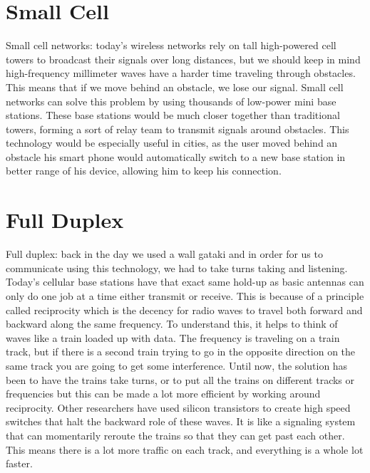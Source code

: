 \section{Small Cell}
Small cell networks: today’s wireless networks rely on tall high-powered cell towers to broadcast their signals over long distances, but we should keep in mind high-frequency millimeter waves have a harder time traveling through obstacles. This means that if we move behind an obstacle, we lose our signal. Small cell networks can solve this problem by using thousands of low-power mini base stations. These base stations would be much closer together than traditional towers, forming a sort of relay team to transmit signals around obstacles. This technology would be especially useful in cities, as the user moved behind an obstacle his smart phone would automatically switch to a new base station in better range of his device, allowing him to keep his connection.

\section{Full Duplex}
Full duplex: back in the day we used a wall gataki and in order for us to communicate using this technology, we had to take turns taking and listening. Today’s cellular base stations have that exact same hold-up as basic antennas can only do one job at a time either transmit or receive. This is because of a principle called reciprocity which is the decency for radio waves to travel both forward and backward along the same frequency. To understand this, it helps to think of waves like a train loaded up with data. The frequency is traveling on a train track, but if there is a second train trying to go in the opposite direction on the same track you are going to get some interference. Until now, the solution has been to have the trains take turns, or to put all the trains on different tracks or frequencies but this can be made a lot more efficient by working around reciprocity. Other researchers have used silicon transistors to create high speed switches that halt the backward role of these waves. It is like a signaling system that can momentarily reroute the trains so that they can get past each other. This means there is a lot more traffic on each track, and everything is a whole lot faster.

